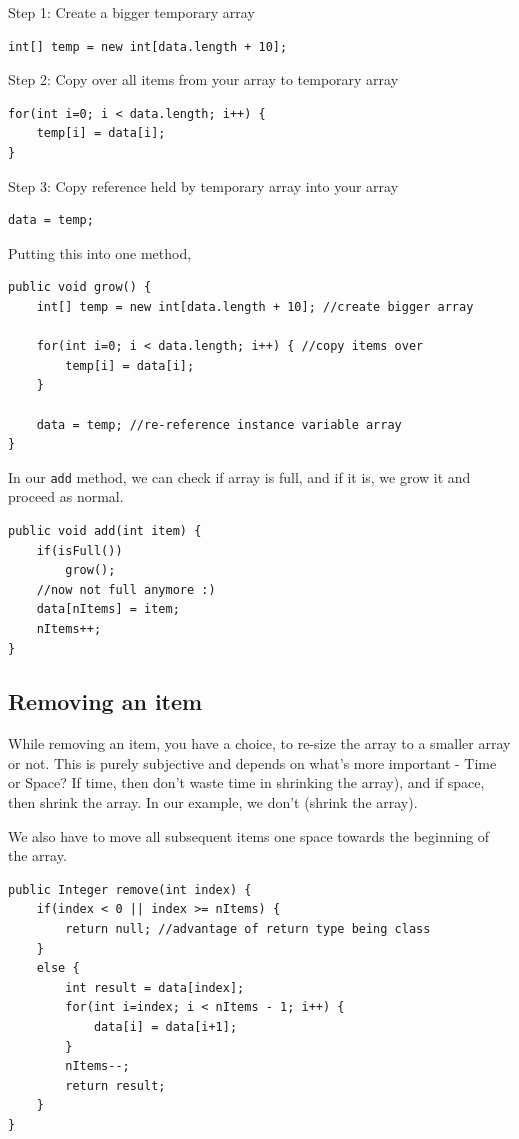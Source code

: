 Step 1: Create a bigger temporary array
\begin{lstlisting}
int[] temp = new int[data.length + 10];
\end{lstlisting}
Step 2: Copy over all items from your array to temporary array	
\begin{lstlisting}
for(int i=0; i < data.length; i++) {
	temp[i] = data[i];
}
\end{lstlisting}
Step 3: Copy reference held by temporary array into your array
\begin{lstlisting}
data = temp;
\end{lstlisting}

Putting this into one method,

\begin{lstlisting}
public void grow() {
	int[] temp = new int[data.length + 10]; //create bigger array
	
	for(int i=0; i < data.length; i++) { //copy items over 
		temp[i] = data[i];
	}
	
	data = temp; //re-reference instance variable array
}	
\end{lstlisting}

In our \texttt{add} method, we can check if array is full, and if it is, we grow it and proceed as normal.

\begin{lstlisting}
public void add(int item) {
	if(isFull())
		grow();
	//now not full anymore :)
	data[nItems] = item;
	nItems++;
}
\end{lstlisting}

\subsection{Removing an item}

While removing an item, you have a choice, to re-size the array to a smaller array or not. This is purely subjective and depends on what's more important - Time or Space? If time, then don't waste time in shrinking the array), and if space, then shrink the array. In our example, we don't (shrink the array).

We also have to move all subsequent items one space towards the beginning of the array.

\begin{lstlisting}
public Integer remove(int index) {
	if(index < 0 || index >= nItems) {
		return null; //advantage of return type being class
	}
	else {
		int result = data[index];
		for(int i=index; i < nItems - 1; i++) {
			data[i] = data[i+1];
		}
		nItems--;
		return result;
	}
}
\end{lstlisting}

